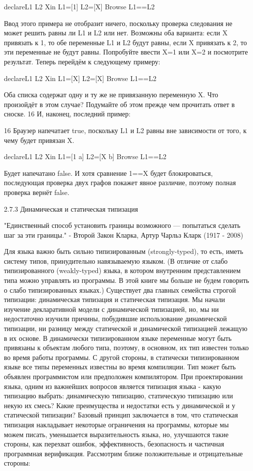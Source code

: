 declareL1 L2 Xin
L1=[1]
L2=[X]
{Browse L1==L2}

Ввод этого примера не отобразит ничего, поскольку проверка следования не может решить равны ли L1 и L2 или нет. Возможны оба варианта: если X привязать к 1, то обе переменные L1 и L2 будут равны, если X привязать к 2, то эти переменные не будут равны. Попробуйте ввести X=1 или X=2 и посмотрите результат. Теперь перейдём к следующему примеру:

declareL1 L2 Xin
L1=[X]
L2=[X]
{Browse L1==L2}

Оба списка содержат одну и ту же не привязанную переменную X. Что произойдёт в этом случае? Подумайте об этом прежде чем прочитать ответ в сноске. 16 И, наконец, последний пример:

16 Браузер напечатает true, поскольку L1 и L2 равны вне зависимости от того, к чему будет привязан X.

declareL1 L2 Xin
L1=[1 a]
L2=[X b]
{Browse L1==L2}

Будет напечатано false. И хотя сравнение 1==X будет блокироваться, последующая проверка двух графов покажет явное различие, поэтому полная проверка вернёт false.

2.7.3 Динамическая и статическая типизация

"Единственный способ установить границы возможного — попытаться сделать шаг за эти границы."
- Второй Закон Кларка, Артур Чарльз Кларк (1917 - 2008)

Для языка важно быть сильно типизированным (strongly-typed), то есть, иметь систему типов, принудительно навязываемую языком. (В отличие от слабо типизированного (weakly-typed) языка, в котором внутренним представлением типа можно управлять из программы. В этой книге мы больше не будем говорить о слабо типизированных языках.) Существует два главных семейства строгой типизации: динамическая типизация и статическая типизация. Мы начали изучение декларативной модели с динамической типизацией, но, мы ни недостаточно изучили причины, побудившие использование динамической типизации, ни разницу между статической и динамической типизацией лежащую в их основе. В динамически типизированном языке переменные могут быть привязаны к объектам любого типа, поэтому, в основном, их тип известен только во время работы программы. С другой стороны, в статически типизированном языке все типы переменных известны во время компиляции. Тип может быть объявлен программистом или предположен компилятором. При проектировании языка, одним из важнейших вопросов является типизация языка - какую типизацию выбрать: динамическую типизацию, статическую типизацию или некую их смесь? Какие преимущества и недостатки есть у динамической и у статической типизации? Базовый принцип заключается в том, что статическая типизация накладывает некоторые ограничения на программы, которые мы можем писать, уменьшается выразительность языка, но, улучшаются такие стороны, как перехват ошибок, эффективность, безопасность и частичная программная верификация. Рассмотрим ближе положительные и отрицательные стороны:

